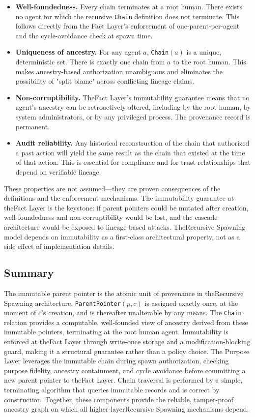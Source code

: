 \begin{itemize}
\item \textbf{Well-foundedness.} Every chain terminates at a root human. There exists no agent for which the recursive \texttt{Chain} definition does not terminate. This follows directly from the Fact Layer's enforcement of one-parent-per-agent and the cycle-avoidance check at spawn time.
\item \textbf{Uniqueness of ancestry.} For any agent $a$, \texttt{Chain}$(a)$ is a unique, deterministic set. There is exactly one chain from $a$ to the root human. This makes ancestry-based authorization unambiguous and eliminates the possibility of "split blame" across conflicting lineage claims.
\item \textbf{Non-corruptibility.} TheFact Layer's immutability guarantee means that no agent's ancestry can be retroactively altered, including by the root human, by system administrators, or by any privileged process. The provenance record is permanent.
\item \textbf{Audit reliability.} Any historical reconstruction of the chain that authorized a past action will yield the same result as the chain that existed at the time of that action. This is essential for compliance and for trust relationships that depend on verifiable lineage.
\end{itemize}

These properties are not assumed—they are proven consequences of the definitions and the enforcement mechanisms. The immutability guarantee at theFact Layer is the keystone: if parent pointers could be mutated after creation, well-foundedness and non-corruptibility would be lost, and the cascade architecture would be exposed to lineage-based attacks. TheRecursive Spawning model depends on immutability as a first-class architectural property, not as a side effect of implementation details.

\subsection{Summary}

The immutable parent pointer is the atomic unit of provenance in theRecursive Spawning architecture. \texttt{ParentPointer}$(p, c)$ is assigned exactly once, at the moment of $c$'s creation, and is thereafter unalterable by any means. The \texttt{Chain} relation provides a computable, well-founded view of ancestry derived from these immutable pointers, terminating at the root human agent. Immutability is enforced at theFact Layer through write-once storage and a modification-blocking guard, making it a structural guarantee rather than a policy choice. The Purpose Layer leverages the immutable chain during spawn authorization, checking purpose fidelity, ancestry containment, and cycle avoidance before committing a new parent pointer to theFact Layer. Chain traversal is performed by a simple, terminating algorithm that queries immutable records and is correct by construction. Together, these components provide the reliable, tamper-proof ancestry graph on which all higher-layerRecursive Spawning mechanisms depend.
